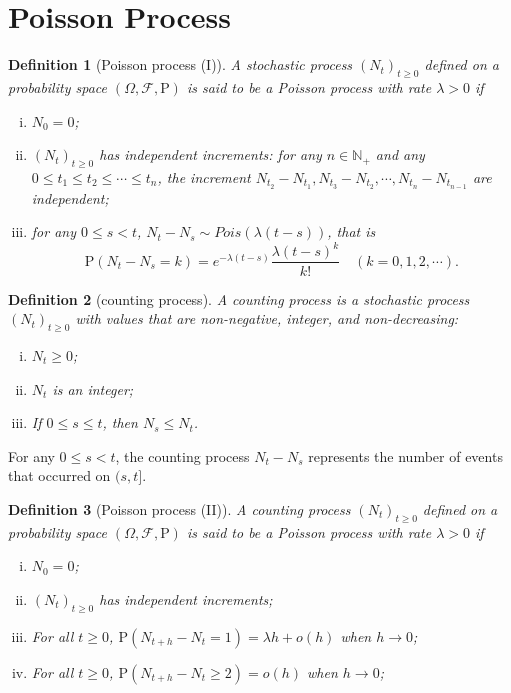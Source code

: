 \documentclass{article}
\newtheorem{definition}{Definition}[section]
\theoremstyle{nonumberplain}
\begin{document}
\section{Poisson Process}
\begin{definition}[Poisson process (I)]
	A stochastic process $(N_t)_{t\ge0}$ defined on a probability space $(\Omega,\mathcal{F},\mathrm{P})$ is said to be a \emph{Poisson process} with rate $\lambda>0$ if
	\begin{enumerate}[(i)]
		\item $N_0=0$;
		\item \hypertarget{Definition 2.1(ii)}{} $(N_t)_{t\ge0}$ has independent increments: for any $n\in \mathbb{N}_+$ and any $0\le t_1\le t_2 \le\cdots\le t_n$, the increment $N_{t_2}-N_{t_1},N_{t_3}-N_{t_2},\cdots,N_{t_n}-N_{t_{n-1}}$ are independent;
		\item \hypertarget{Definition 2.1(iii)}{}for any $0\le s < t$, $N_t-N_s\sim Pois(\lambda(t-s))$, that is 
		\[
		\mathrm{P}(N_t-N_s=k)=e^{-\lambda(t-s)}\dfrac{\lambda(t-s)^k}{k!}\quad(k=0,1,2,\cdots).
		\]
	\end{enumerate}	
\end{definition}

\begin{definition}[counting process]
	A \emph{counting process} is a stochastic process $(N_t)_{t\ge 0}$ with values that are non-negative, integer, and non-decreasing:
	\begin{enumerate}[(i)]
		\item $N_t\ge0$;
		\item $N_t$ is an integer;
		\item If $0\le s\le t$, then $N_s \le N_t$.
	\end{enumerate}	
		
\end{definition}
For any $0\le s<t$, the counting process $N_t-N_s$ represents the number of events that occurred on $(s,t]$.  


\begin{definition}[Poisson process (II)]
	A counting process $(N_t)_{t\ge0}$ defined on a probability space $(\Omega,\mathcal{F},\mathrm{P})$ is said to be a \emph{Poisson process} with rate $\lambda>0$ if
	\begin{enumerate}[(i)]
		\item $N_0=0$;
		\item $(N_t)_{t\ge0}$ has independent increments;
		\item \hypertarget{Definition 2.3(iii)}{}For all $t\ge0$, $\mathrm{P}(N_{t+h}-N_t=1)=\lambda h+o(h)$ when $h\to0$;
		\item \hypertarget{Definition 2.3(iv)}{}For all $t\ge0$, $\mathrm{P}(N_{t+h}-N_t\ge2)=o(h)$ when $h\to0$;
	\end{enumerate}	
\end{definition}
\end{document}

